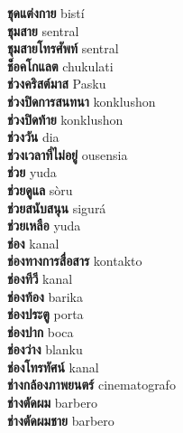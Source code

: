 \textbf{ ชุดแต่งกาย  } bistí \\
\textbf{ ชุมสาย  } sentral \\
\textbf{ ชุมสายโทรศัพท์  } sentral \\
\textbf{ ช็อคโกแลต  } chukulati \\
\textbf{ ช่วงคริสต์มาส  } Pasku \\
\textbf{ ช่วงปิดการสนทนา  } konklushon \\
\textbf{ ช่วงปิดท้าย  } konklushon \\
\textbf{ ช่วงวัน  } dia \\
\textbf{ ช่วงเวลาที่ไม่อยู่  } ousensia \\
\textbf{ ช่วย  } yuda \\
\textbf{ ช่วยดูแล  } sòru \\
\textbf{ ช่วยสนับสนุน  } sigurá \\
\textbf{ ช่วยเหลือ  } yuda \\
\textbf{ ช่อง  } kanal \\
\textbf{ ช่องทางการสื่อสาร  } kontakto \\
\textbf{ ช่องทีวี  } kanal \\
\textbf{ ช่องท้อง  } barika \\
\textbf{ ช่องประตู  } porta \\
\textbf{ ช่องปาก  } boca \\
\textbf{ ช่องว่าง  } blanku \\
\textbf{ ช่องโทรทัศน์  } kanal \\
\textbf{ ช่างกล้องภาพยนตร์  } cinematografo \\
\textbf{ ช่างตัดผม  } barbero \\
\textbf{ ช่างตัดผมชาย  } barbero \\
